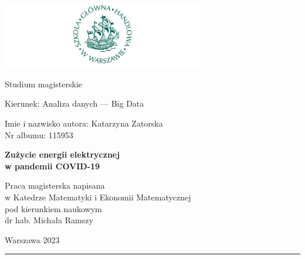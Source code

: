 \documentclass[polish, twoside, 12pt, a4paper]{article}
\theoremstyle{definition}
\theoremstyle{plain}
\theoremstyle{remark}
\begin{document}
\begin{titlepage}
\centering

\includegraphics[width=0.66\textwidth]{logo.JPG}

\vspace*{0.5cm}
Studium magisterskie\\
\begin{flushleft}
Kierunek: Analiza danych --- Big Data\\
\end{flushleft}

\vspace*{.5cm}
\rule{0cm}{1cm}\hfill
\begin{minipage}{9cm}
Imie i nazwisko autora: Katarzyna Zatorska\\
Nr albumu: 115953
\end{minipage}

\vspace*{1cm}
\begin{minipage}{12cm}
\centering
\Large
\textbf{Zużycie energii elektrycznej\\w pandemii COVID-19}
\end{minipage}

\vspace*{2cm}
\rule{0cm}{1cm}\hfill
\begin{minipage}{9cm}
Praca magisterska napisana\\
w Katedrze Matematyki i Ekonomii Matematycznej\\
pod kierunkiem naukowym\\
dr hab. Michała Ramszy
\end{minipage}

\vfill
Warszawa 2023
\end{titlepage}

\rule{1ex}{0ex}\clearpage


\cleardoublepage
\tableofcontents

\cleardoublepage
\end{document}
